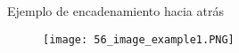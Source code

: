\begin{frame}{Ejemplo de encadenamiento hacia atrás}

    \begin{figure}[t]
    \centering
    \texttt{[image: 56\_image\_example1.PNG]}
    \end{figure}
   
\end{frame}
